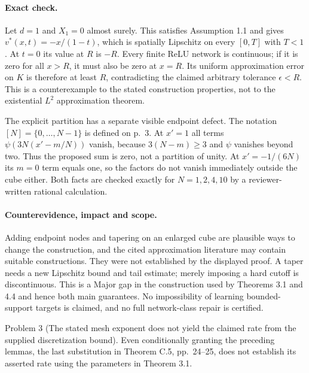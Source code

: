 \documentclass[10pt]{article}
\begin{document}
\paragraph*{Exact check.}\mbox{}\par
Let \(d=1\) and \(X_1=0\) almost surely. This satisfies Assumption 1.1 and gives \(v^*(x,t)=-x/(1-t)\), which is spatially Lipschitz on every \([0,T]\) with \(T<1\). At \(t=0\) its value at \(R\) is \(-R\). Every finite ReLU network is continuous; if it is zero for all \(x>R\), it must also be zero at \(x=R\). Its uniform approximation error on \(K\) is therefore at least \(R\), contradicting the claimed arbitrary tolerance \(\epsilon<R\). This is a counterexample to the stated construction properties, not to the existential \(L^2\) approximation theorem.\par
The explicit partition has a separate visible endpoint defect. The notation \([N]=\{0,\ldots,N-1\}\) is defined on p. 3. At \(x'=1\) all terms \(\psi(3N(x'-m/N))\) vanish, because \(3(N-m)\geq3\) and \(\psi\) vanishes beyond two. Thus the proposed sum is zero, not a partition of unity. At \(x'=-1/(6N)\) its \(m=0\) term equals one, so the factors do not vanish immediately outside the cube either. Both facts are checked exactly for \(N=1,2,4,10\) by a reviewer-written rational calculation.\par
\paragraph*{Counterevidence, impact and scope.}\mbox{}\par
Adding endpoint nodes and tapering on an enlarged cube are plausible ways to change the construction, and the cited approximation literature may contain suitable constructions. They were not established by the displayed proof. A taper needs a new Lipschitz bound and tail estimate; merely imposing a hard cutoff is discontinuous. This is a Major gap in the construction used by Theorems 3.1 and 4.4 and hence both main guarantees. No impossibility of learning bounded-support targets is claimed, and no full network-class repair is certified.\par
Problem 3 (The stated mesh exponent does not yield the claimed rate from the supplied discretization bound).  Even conditionally granting the preceding lemmas, the last substitution in Theorem C.5, pp. 24–25, does not establish its asserted rate using the parameters in Theorem 3.1.\par
\end{document}
